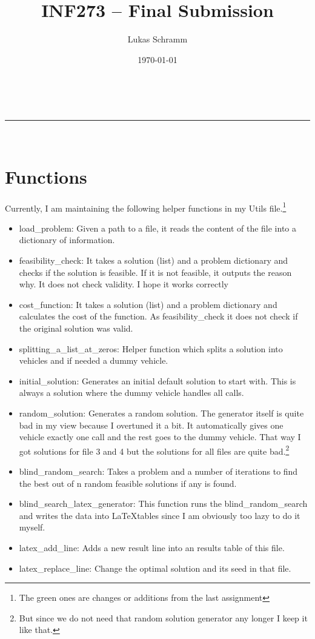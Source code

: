 \documentclass[a4paper,11pt]{article}
\makeatletter
\newcommand{\linia}{\rule{\linewidth}{0.5pt}}
\theoremstyle{mytheor}
\renewcommand{\maketitle}{
\begin{center}
\vspace{2ex}
{\huge \textsc{\@title}}
\vspace{1ex}
\\
\linia\\
\@author \hfill \@date
\vspace{4ex}
\end{center}
}
\makeatother
\begin{document}
\title{INF273 – Final Submission}

\author{Lukas Schramm}

\date{\today}

\maketitle

\section{Functions}
Currently, I am maintaining the following helper functions in my Utils file.\footnote{The green ones are changes or additions from the last assignment}
\begin{itemize}
\item load\_problem: Given a path to a file, it reads the content of the file into a dictionary of information.
\item feasibility\_check: It takes a solution (list) and a problem dictionary and checks if the solution is feasible. If it is not feasible, it outputs the reason why. It does not check validity. I hope it works correctly
\item cost\_function: It takes a solution (list) and a problem dictionary and calculates the cost of the function. As feasibility\_check it does not check if the original solution was valid.
\item splitting\_a\_list\_at\_zeros: Helper function which splits a solution into vehicles and if needed a dummy vehicle.
\item initial\_solution: Generates an initial default solution to start with. This is always a solution where the dummy vehicle handles all calls.

\item random\_solution: Generates a random solution. The generator itself is quite bad in my view because I overtuned it a bit. It automatically gives one vehicle exactly one call and the rest goes to the dummy vehicle. That way I got solutions for file 3 and 4 but the solutions for all files are quite bad.\footnote{But since we do not need that random solution generator any longer I keep it like that.}
\item blind\_random\_search: Takes a problem and a number of iterations to find the best out of n random feasible solutions if any is found.
\item blind\_search\_latex\_generator: This function runs the blind\_random\_search and writes the data into \LaTeX tables since I am obviously too lazy to do it myself.
\item latex\_add\_line: Adds a new result line into an results table of this file.
\item latex\_replace\_line: Change the optimal solution and its seed in that file.


\end{itemize}
\end{document}
